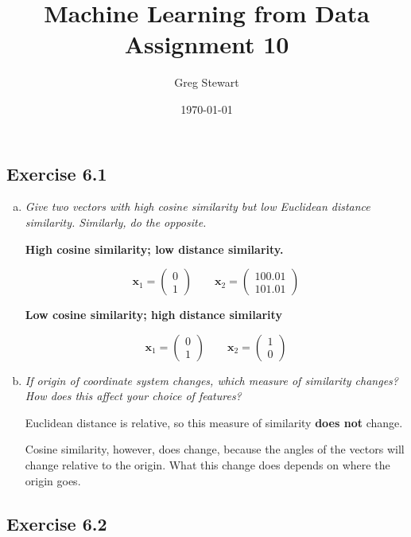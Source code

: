 \documentclass{article}
\title{Machine Learning from Data Assignment 10}
\author{Greg Stewart}
\date{\today}
\renewcommand{\vec}[1]{\mathbf{#1}}
\begin{document}
\maketitle

\subsection*{Exercise 6.1}

\begin{enumerate}[(a)]
  \item \textit{Give two vectors with high cosine similarity but low Euclidean distance 
    similarity. Similarly, do the opposite.}

    \textbf{High cosine similarity; low distance similarity.}

    \[\vec{x}_1 = 
      \begin{pmatrix} 0 \\ 1 \end{pmatrix}
      \qquad
      \vec{x}_2 = 
      \begin{pmatrix} 100.01 \\ 101.01 \end{pmatrix}
    \]

    \textbf{Low cosine similarity; high distance similarity}

    \[\vec{x}_1 =
      \begin{pmatrix} 0 \\ 1 \end{pmatrix}
      \qquad 
      \vec{x}_2 =
      \begin{pmatrix} 1 \\ 0 \end{pmatrix}
    \]

  \item \textit{If origin of coordinate system changes, which measure of similarity changes? 
    How does this affect your choice of features?}

    Euclidean distance is relative, so this measure of similarity \textbf{does not} change.

    Cosine similarity, however, does change, because the angles of the vectors will change
    relative to the origin. What this change does depends on where the origin goes.

\end{enumerate}

\subsection*{Exercise 6.2}
\end{document}
